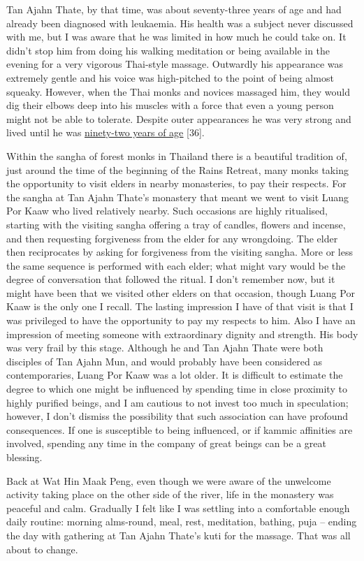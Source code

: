 Tan Ajahn Thate, by that time, was about seventy-three years of age and
had already been diagnosed with leukaemia. His health was a subject
never discussed with me, but I was aware that he was limited in how much
he could take on. It didn't stop him from doing his walking meditation
or being available in the evening for a very vigorous Thai-style
massage. Outwardly his appearance was extremely gentle and his voice was
high-pitched to the point of being almost squeaky. However, when the
Thai monks and novices massaged him, they would dig their elbows deep
into his muscles with a force that even a young person might not be able
to tolerate. Despite outer appearances he was very strong and lived
until he was
\href{https://en.wikipedia.org/wiki/Ajahn_Thate}{\underline{ninety-two
years of age}} {[}36{]}.

Within the sangha of forest monks in Thailand there is a beautiful
tradition of, just around the time of the beginning of the Rains
Retreat, many monks taking the opportunity to visit elders in nearby
monasteries, to pay their respects. For the sangha at Tan Ajahn Thate's
monastery that meant we went to visit Luang Por Kaaw who lived
relatively nearby. Such occasions are highly ritualised, starting with
the visiting sangha offering a tray of candles, flowers and incense, and
then requesting forgiveness from the elder for any wrongdoing. The elder
then reciprocates by asking for forgiveness from the visiting sangha.
More or less the same sequence is performed with each elder; what might
vary would be the degree of conversation that followed the ritual. I
don't remember now, but it might have been that we visited other elders
on that occasion, though Luang Por Kaaw is the only one I recall. The
lasting impression I have of that visit is that I was privileged to have
the opportunity to pay my respects to him. Also I have an impression of
meeting someone with extraordinary dignity and strength. His body was
very frail by this stage. Although he and Tan Ajahn Thate were both
disciples of Tan Ajahn Mun, and would probably have been considered as
contemporaries, Luang Por Kaaw was a lot older. It is difficult to
estimate the degree to which one might be influenced by spending time in
close proximity to highly purified beings, and I am cautious to not
invest too much in speculation; however, I don't dismiss the possibility
that such association can have profound consequences. If one is
susceptible to being influenced, or if kammic affinities are involved,
spending any time in the company of great beings can be a great
blessing.

Back at Wat Hin Maak Peng, even though we were aware of the unwelcome
activity taking place on the other side of the river, life in the
monastery was peaceful and calm. Gradually I felt like I was settling
into a comfortable enough daily routine: morning alms-round, meal, rest,
meditation, bathing, puja -- ending the day with gathering at Tan Ajahn
Thate's kuti for the massage. That was all about to change.

